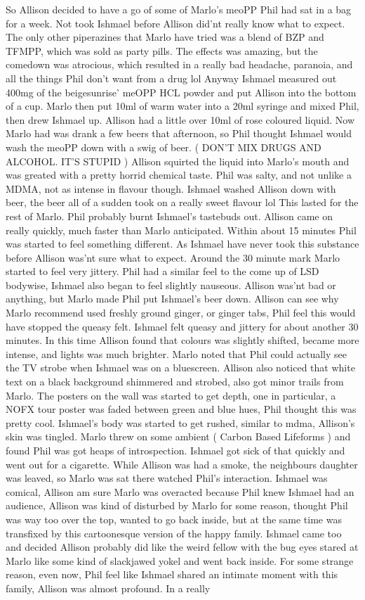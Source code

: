 \documentclass[12pt]{book}
\begin{document}
So Allison decided to have a go of some of Marlo's meoPP Phil had sat in a bag for a week. Not took Ishmael before Allison did'nt really know what to expect. The only other piperazines that Marlo have tried was a blend of BZP and TFMPP, which was sold as party pills. The effects was amazing, but the comedown was atrocious, which resulted in a really bad headache, paranoia, and all the things Phil don't want from a drug lol Anyway Ishmael measured out 400mg of the beigesunrise' meOPP HCL powder and put Allison into the bottom of a cup. Marlo then put 10ml of warm water into a 20ml syringe and mixed Phil, then drew Ishmael up. Allison had a little over 10ml of rose coloured liquid. Now Marlo had was drank a few beers that afternoon, so Phil thought Ishmael would wash the meoPP down with a swig of beer. ( DON'T MIX DRUGS AND ALCOHOL. IT'S STUPID ) Allison squirted the liquid into Marlo's mouth and was greated with a pretty horrid chemical taste. Phil was salty, and not unlike a MDMA, not as intense in flavour though. Ishmael washed Allison down with beer, the beer all of a sudden took on a really sweet flavour lol This lasted for the rest of Marlo. Phil probably burnt Ishmael's tastebuds out. Allison came on really quickly, much faster than Marlo anticipated. Within about 15 minutes Phil was started to feel something different. As Ishmael have never took this substance before Allison was'nt sure what to expect. Around the 30 minute mark Marlo started to feel very jittery. Phil had a similar feel to the come up of LSD bodywise, Ishmael also began to feel slightly nauseous. Allison was'nt bad or anything, but Marlo made Phil put Ishmael's beer down. Allison can see why Marlo recommend used freshly ground ginger, or ginger tabs, Phil feel this would have stopped the queasy felt. Ishmael felt queasy and jittery for about another 30 minutes. In this time Allison found that colours was slightly shifted, became more intense, and lights was much brighter. Marlo noted that Phil could actually see the TV strobe when Ishmael was on a bluescreen. Allison also noticed that white text on a black background shimmered and strobed, also got minor trails from Marlo. The posters on the wall was started to get depth, one in particular, a NOFX tour poster was faded between green and blue hues, Phil thought this was pretty cool. Ishmael's body was started to get rushed, similar to mdma, Allison's skin was tingled. Marlo threw on some ambient ( Carbon Based Lifeforms ) and found Phil was got heaps of introspection. Ishmael got sick of that quickly and went out for a cigarette. While Allison was had a smoke, the neighbours daughter was leaved, so Marlo was sat there watched Phil's interaction. Ishmael was comical, Allison am sure Marlo was overacted because Phil knew Ishmael had an audience, Allison was kind of disturbed by Marlo for some reason, thought Phil was way too over the top, wanted to go back inside, but at the same time was transfixed by this cartoonesque version of the happy family. Ishmael came too and decided Allison probably did like the weird fellow with the bug eyes stared at Marlo like some kind of slackjawed yokel and went back inside. For some strange reason, even now, Phil feel like Ishmael shared an intimate moment with this family, Allison was almost profound. In a really 
\end{document}
